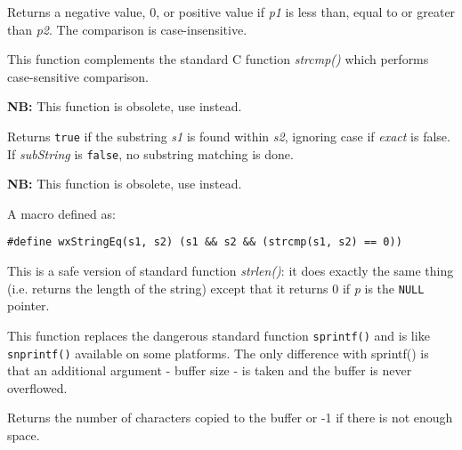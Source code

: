 Returns a negative value, 0, or positive value if {\it p1} is less than, equal
to or greater than {\it p2}. The comparison is case-insensitive.

This function complements the standard C function {\it strcmp()} which performs
case-sensitive comparison.


\label{wxstringmatch}


{\bf NB:} This function is obsolete, use  instead.

Returns {\tt true} if the substring {\it s1} is found within {\it s2},
ignoring case if {\it exact} is false. If {\it subString} is {\tt false},
no substring matching is done.


\label{wxstringeq}


{\bf NB:} This function is obsolete, use  instead.

A macro defined as:

\begin{verbatim}
#define wxStringEq(s1, s2) (s1 && s2 && (strcmp(s1, s2) == 0))
\end{verbatim}


\label{wxstrlen}


This is a safe version of standard function {\it strlen()}: it does exactly the
same thing (i.e. returns the length of the string) except that it returns 0 if
{\it p} is the {\tt NULL} pointer.


\label{wxsnprintf}


This function replaces the dangerous standard function {\tt sprintf()} and is
like {\tt snprintf()} available on some platforms. The only difference with
sprintf() is that an additional argument - buffer size - is taken and the
buffer is never overflowed.

Returns the number of characters copied to the buffer or -1 if there is not
enough space.

